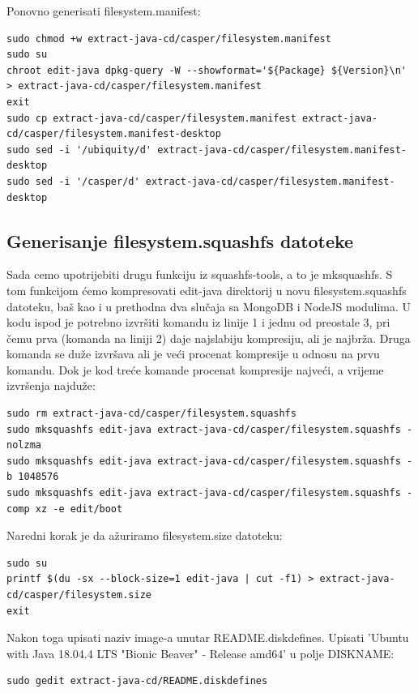 \documentclass[12pt,vi]{mitthesis}
\begin{document}
\noindent
Ponovno generisati filesystem.manifest:
\begin{lstlisting}[style=BashInputStyle]
sudo chmod +w extract-java-cd/casper/filesystem.manifest
sudo su
chroot edit-java dpkg-query -W --showformat='${Package} ${Version}\n' > extract-java-cd/casper/filesystem.manifest
exit
sudo cp extract-java-cd/casper/filesystem.manifest extract-java-cd/casper/filesystem.manifest-desktop
sudo sed -i '/ubiquity/d' extract-java-cd/casper/filesystem.manifest-desktop
sudo sed -i '/casper/d' extract-java-cd/casper/filesystem.manifest-desktop
\end{lstlisting}

\subsection*{Generisanje filesystem.squashfs datoteke}
\noindent
Sada cemo upotrijebiti drugu funkciju iz squashfs-tools, a to je mksquashfs. S tom funkcijom ćemo kompresovati edit-java direktorij u novu filesystem.squashfs datoteku, baš kao i u prethodna dva slučaja sa MongoDB i NodeJS modulima. U kodu ispod je potrebno izvršiti komandu iz linije 1 i jednu od preostale 3, pri čemu prva (komanda na liniji 2) daje najslabiju kompresiju, ali je najbrža. Druga komanda se duže izvršava ali je veći procenat kompresije u odnosu na prvu komandu. Dok je kod treće komande procenat kompresije najveći, a vrijeme izvršenja najduže:
\begin{lstlisting}[style=BashInputStyle]
sudo rm extract-java-cd/casper/filesystem.squashfs
sudo mksquashfs edit-java extract-java-cd/casper/filesystem.squashfs -nolzma 
sudo mksquashfs edit-java extract-java-cd/casper/filesystem.squashfs -b 1048576
sudo mksquashfs edit-java extract-java-cd/casper/filesystem.squashfs -comp xz -e edit/boot
\end{lstlisting}

\noindent
Naredni korak je da ažuriramo filesystem.size datoteku:
\begin{lstlisting}[style=BashInputStyle]
sudo su
printf $(du -sx --block-size=1 edit-java | cut -f1) > extract-java-cd/casper/filesystem.size
exit
\end{lstlisting}

\noindent
Nakon toga upisati naziv image-a unutar README.diskdefines. 
Upisati 'Ubuntu with Java 18.04.4 LTS "Bionic Beaver" - Release amd64' u polje DISKNAME:
\begin{lstlisting}[style=BashInputStyle]
sudo gedit extract-java-cd/README.diskdefines
\end{lstlisting}
\end{document}
